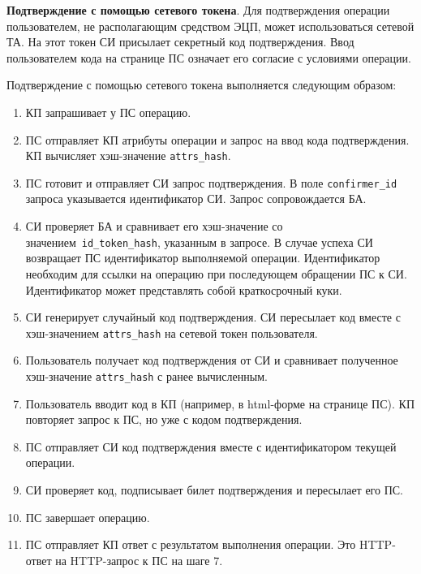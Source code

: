 {\bf Подтверждение с помощью сетевого токена}.
Для подтверждения операции пользователем, не располагающим средством 
ЭЦП, может использоваться сетевой ТА. На этот токен СИ присылает секретный 
код подтверждения. Ввод пользователем кода на странице ПС означает его 
согласие с условиями операции.

Подтверждение с помощью сетевого токена выполняется следующим образом: 
\begin{enumerate}
\item 
КП запрашивает у ПС операцию.

\item 
ПС отправляет КП атрибуты операции и запрос на ввод кода подтверждения.
КП вычисляет хэш-значение \lstinline{attrs_hash}.

\item 
ПС готовит и отправляет СИ запрос подтверждения.
В поле \lstinline{confirmer_id} запроса указывается идентификатор СИ. 
Запрос сопровождается БА.

\item 
СИ проверяет БА и сравнивает его хэш-значение со 
значением~\lstinline{id_token_hash}, указанным в запросе.
%
В случае успеха СИ возвращает ПС идентификатор выполняемой операции.
Идентификатор необходим для ссылки на операцию
при последующем обращении ПС к СИ.
Идентификатор может представлять собой краткосрочный куки.

\item 
СИ генерирует случайный код подтверждения.
%
СИ пересылает код вместе с хэш-значением \lstinline{attrs_hash}
на сетевой токен пользователя.

\item 
Пользователь получает код подтверждения от СИ
и сравнивает полученное хэш-значение \lstinline{attrs_hash} 
с ранее вычисленным. 

\item 
Пользователь вводит код в КП (например, в html-форме на странице ПС).
КП повторяет запрос к ПС, но уже с кодом подтверждения.

\item 
ПС отправляет СИ код подтверждения вместе с идентификатором текущей операции.

\item 
СИ проверяет код, подписывает билет подтверждения и пересылает его ПС.

\item
ПС завершает операцию.

\item 
ПС отправляет КП ответ с результатом выполнения операции.
Это HTTP-ответ на HTTP-запрос к ПС на шаге 7.
\end{enumerate}


